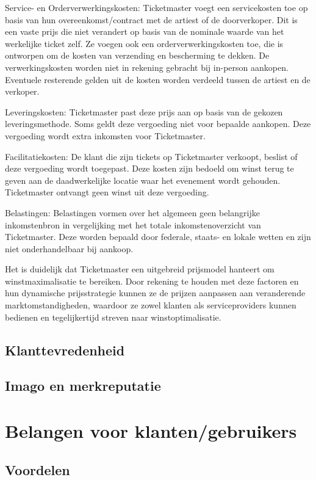 \documentclass[a4paper,10pt]{article}
\begin{document}
Service- en Orderverwerkingskosten: Ticketmaster voegt een servicekosten toe op basis van hun overeenkomst/contract met de artiest of de doorverkoper. Dit is een vaste prijs die niet verandert op basis van de nominale waarde van het werkelijke ticket zelf. Ze voegen ook een orderverwerkingskosten toe, die is ontworpen om de kosten van verzending en bescherming te dekken. De verwerkingskosten worden niet in rekening gebracht bij in-person aankopen. Eventuele resterende gelden uit de kosten worden verdeeld tussen de artiest en de verkoper.

Leveringskosten: Ticketmaster past deze prijs aan op basis van de gekozen leveringsmethode. Soms geldt deze vergoeding niet voor bepaalde aankopen. Deze vergoeding wordt extra inkomsten voor Ticketmaster.

Facilitatiekosten: De klant die zijn tickets op Ticketmaster verkoopt, beslist of deze vergoeding wordt toegepast. Deze kosten zijn bedoeld om winst terug te geven aan de daadwerkelijke locatie waar het evenement wordt gehouden. Ticketmaster ontvangt geen winst uit deze vergoeding.

Belastingen: Belastingen vormen over het algemeen geen belangrijke inkomstenbron in vergelijking met het totale inkomstenoverzicht van Ticketmaster. Deze worden bepaald door federale, staats- en lokale wetten en zijn niet onderhandelbaar bij aankoop.

\vspace{10 mm}

Het is duidelijk dat Ticketmaster een uitgebreid prijsmodel hanteert om winstmaximalisatie te bereiken. Door rekening te houden met deze factoren en hun dynamische prijsstrategie kunnen ze de prijzen aanpassen aan veranderende marktomstandigheden, waardoor ze zowel klanten als serviceproviders kunnen bedienen en tegelijkertijd streven naar winstoptimalisatie.

\subsection{Klanttevredenheid}
\subsection{Imago en merkreputatie}

\section{Belangen voor klanten/gebruikers}
\subsection{Voordelen}
\end{document}
